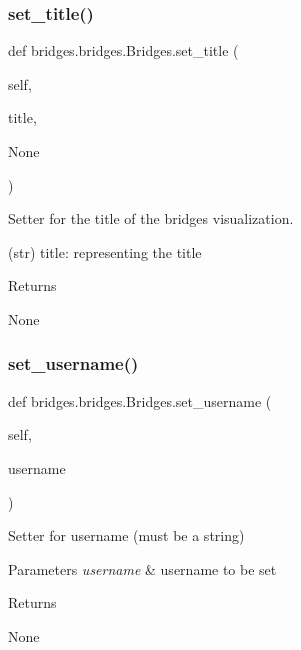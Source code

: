 \subsubsection{\texorpdfstring{set\+\_\+title()}{set\_title()}}
{\footnotesize\ttfamily def bridges.\+bridges.\+Bridges.\+set\+\_\+title (\begin{DoxyParamCaption}\item[{}]{self,  }\item[{}]{title,  }\item[{}]{None }\end{DoxyParamCaption})}



Setter for the title of the bridges visualization. 

(str) title\+: representing the title \begin{DoxyReturn}{Returns}


None 
\end{DoxyReturn}
\mbox{\label{classbridges_1_1bridges_1_1_bridges_a3f97735d336faf40585e99362d64a3ee}} 
\subsubsection{\texorpdfstring{set\+\_\+username()}{set\_username()}}
{\footnotesize\ttfamily def bridges.\+bridges.\+Bridges.\+set\+\_\+username (\begin{DoxyParamCaption}\item[{}]{self,  }\item[{}]{username }\end{DoxyParamCaption})}



Setter for username (must be a string) 


\begin{DoxyParams}{Parameters}
{\em username} & username to be set \\
\hline
\end{DoxyParams}
\begin{DoxyReturn}{Returns}


None 
\end{DoxyReturn}
\mbox{\label{classbridges_1_1bridges_1_1_bridges_ab50d018b5178ca33de24157b7b6de285}} 
